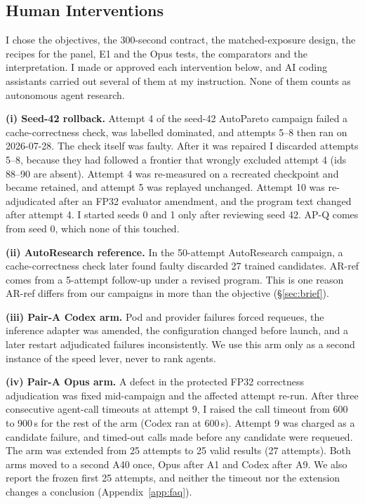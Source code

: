 \documentclass{article}
\newif\ifshowhumanmarkers \showhumanmarkersfalse
\newcommand{\humantag}[1]{{\color{humanframe}\sffamily\scriptsize\bfseries HUMAN AUTHOR MUST REWRITE/VERIFY [#1]}\ }
\newcommand{\humanauthor}[2][]{\ifshowhumanmarkers\begin{humanbox}\humantag{#1}#2\end{humanbox}\else #2\par\fi}
\begin{document}
\subsection{Human Interventions}\label{sec:interventions}
\humanauthor[P2-06 r6]{I chose the objectives, the 300-second contract, the matched-exposure design, the recipes for the panel, E1 and the Opus tests, the comparators and the interpretation. I made or approved each intervention below, and AI coding assistants carried out several of them at my instruction. None of them counts as autonomous agent research.

\textbf{(i) Seed-42 rollback.} Attempt 4 of the seed-42 AutoPareto campaign failed a cache-correctness check, was labelled dominated, and attempts 5--8 then ran on 2026-07-28. The check itself was faulty. After it was repaired I discarded attempts 5--8, because they had followed a frontier that wrongly excluded attempt 4 (ids 88--90 are absent). Attempt 4 was re-measured on a recreated checkpoint and became retained, and attempt 5 was replayed unchanged. Attempt 10 was re-adjudicated after an FP32 evaluator amendment, and the program text changed after attempt 4. I started seeds 0 and 1 only after reviewing seed 42. AP-Q comes from seed 0, which none of this touched.

\textbf{(ii) AutoResearch reference.} In the 50-attempt AutoResearch campaign, a cache-correctness check later found faulty discarded 27 trained candidates. AR-ref comes from a 5-attempt follow-up under a revised program. This is one reason AR-ref differs from our campaigns in more than the objective (\S\ref{sec:brief}).

\textbf{(iii) Pair-A Codex arm.} Pod and provider failures forced requeues, the inference adapter was amended, the configuration changed before launch, and a later restart adjudicated failures inconsistently. We use this arm only as a second instance of the speed lever, never to rank agents.

\textbf{(iv) Pair-A Opus arm.} A defect in the protected FP32 correctness adjudication was fixed mid-campaign and the affected attempt re-run. After three consecutive agent-call timeouts at attempt 9, I raised the call timeout from 600 to 900\,s for the rest of the arm (Codex ran at 600\,s). Attempt 9 was charged as a candidate failure, and timed-out calls made before any candidate were requeued. The arm was extended from 25 attempts to 25 valid results (27 attempts). Both arms moved to a second A40 once, Opus after A1 and Codex after A9. We also report the frozen first 25 attempts, and neither the timeout nor the extension changes a conclusion (Appendix~\ref{app:faq}).

}
\end{document}
